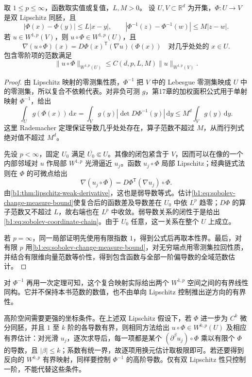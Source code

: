 \begin{theorem}\label{b1:thm:sobolev-bilipschitz-change}
取 \(1\leq p\leq\infty\)，函数取实值或复值，\(L,M>0\)。
设 \(U,V\subset\mathbb R^d\) 为开集，\(\Phi:U\to V\) 是双 Lipschitz 同胚，且
\[
 |\Phi(x)-\Phi(y)|\le L|x-y|,\qquad
 |\Phi^{-1}(z)-\Phi^{-1}(w)|\le M|z-w|.
\]
若 \(u\in W^{1,p}(V)\)，则 \(u\circ\Phi\in W^{1,p}(U)\)，且
\begin{equation}\label{b1:eq:sobolev-coordinate-chain}
 \nabla(u\circ\Phi)(x)
   =D\Phi(x)^{\mathsf T}(\nabla u)(\Phi(x))
 \quad\text{对几乎处处的 }x\in U.
\end{equation}
包含零阶项的范数满足
\[
 \|u\circ\Phi\|_{W^{1,p}(U)}
 \le C(d,p,L,M)\|u\|_{W^{1,p}(V)}.
\]
\end{theorem}
\begin{proof}
由 Lipschitz 映射的零测集性质，\(\Phi^{-1}\) 把 \(V\) 中的 Lebesgue 零测集映成 \(U\) 中的零测集，所以复合不依赖代表。对非负可测 \(g\)，第17章的加权面积公式用于单射映射 \(\Phi^{-1}\)，给出
\begin{equation}\label{b1:eq:sobolev-change-measure-bound}
 \int_U g(\Phi(x))\,\mathrm dx
 =\int_V g(y)|\det D\Phi^{-1}(y)|\,\mathrm dy
 \le M^d\int_Vg(y)\,\mathrm dy.
\end{equation}
这里 Rademacher 定理保证导数几乎处处存在，算子范数不超过 \(M\)，从而行列式绝对值不超过 \(M^d\)。

先设 \(p<\infty\)，固定 \(U_0\) 满足 \(\overline{U_0}\Subset U\)。其像的闭包紧含于 \(V\)，因而可以在像的一个内部邻域对 \(u\) 作局部 \(W^{1,p}\) 光滑逼近 \(u_j\)。函数 \(u_j\circ\Phi\) 局部 Lipschitz；经典链式法则在 \(\Phi\) 的可微点给出
\[
 \nabla(u_j\circ\Phi)
 =D\Phi^{\mathsf T}(\nabla u_j)\circ\Phi.
\]
由\cref{b1:thm:lipschitz-weak-derivative}，这也是弱导数等式。估计\eqref{b1:eq:sobolev-change-measure-bound}使复合后的函数差及导数差在 \(U_0\) 中依 \(L^p\) 趋零；\(D\Phi\) 的算子范数又不超过 \(L\)，故右端也在 \(L^p\) 中收敛。弱导数关系的闭性于是给出\eqref{b1:eq:sobolev-coordinate-chain}。由于 \(U_0\) 任意，这一关系在整个 \(U\) 上成立。

若 \(p=\infty\)，同一局部证明先使用有限指数 \(1\)，得到公式后再取本性界。最后，对有限 \(p\) 用\eqref{b1:eq:sobolev-change-measure-bound}，对无穷端点用零测集拉回性质，并结合有限维向量范数等价性，得到包含函数与全部一阶偏导数的全域范数估计。
\end{proof}

对 \(\Phi^{-1}\) 再用一次定理可知，这个复合映射实际给出两个 \(W^{1,p}\) 空间之间的有界线性同构。它并不保持本书范数的数值，也不由单向 Lipschitz 控制推出逆方向的有界性。

\ProseParagraphBreak

高阶空间需要更强的坐标条件。在上述双 Lipschitz 假设下，若 \(\Phi\) 进一步为 \(C^k\) 微分同胚，并且 \(1\) 至 \(k\) 阶的各导数有界，则相同方法给出 \(u\circ\Phi\in W^{k,p}(U)\) 及相应有界估计：对光滑 \(u_j\)，逐次求导后，每一项都是某个 \((\partial^\beta u_j)\circ\Phi\) 乘以有限个 \(\Phi\) 的导数，且 \(|\beta|\le k\)；系数有统一界，故逐项用换元估计取极限即可。若还要得到反向的 \(W^{k,p}\) 有界映射，同样要控制 \(\Phi^{-1}\) 的高阶导数。仅有双 Lipschitz 性只控制一阶，不能代替这些条件。
